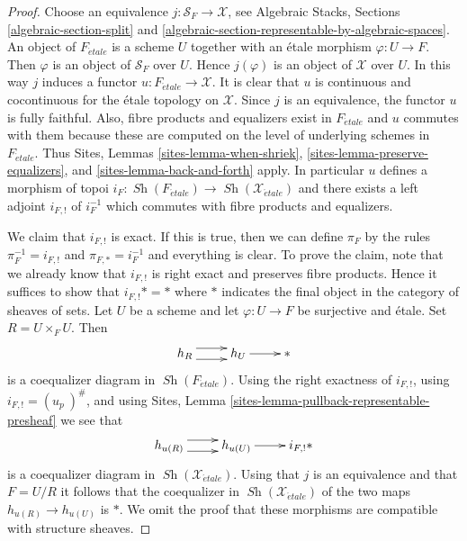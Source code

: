 \documentclass{stacks-project}
\theoremstyle{plain}
\theoremstyle{definition}
\theoremstyle{remark}
\numberwithin{equation}{subsection}
\def\Sh{\mathop{\mathit{Sh}}\nolimits}
\def\etale{{\acute{e}tale}}
\begin{document}
\begin{proof}
Choose an equivalence $j : \mathcal{S}_F \to \mathcal{X}$, see
Algebraic Stacks, Sections \ref{algebraic-section-split} and
\ref{algebraic-section-representable-by-algebraic-spaces}.
An object of $F_\etale$ is a scheme $U$ together with an
\'etale morphism $\varphi : U \to F$. Then $\varphi$ is an object
of $\mathcal{S}_F$ over $U$. Hence $j(\varphi)$ is an object of
$\mathcal{X}$ over $U$. In this way $j$ induces a functor
$u : F_\etale \to \mathcal{X}$. It is clear that
$u$ is continuous and cocontinuous for the \'etale topology on
$\mathcal{X}$. Since $j$ is an equivalence, the functor $u$ is fully
faithful. Also, fibre products and equalizers exist in $F_\etale$
and $u$ commutes with them because these are computed on the level
of underlying schemes in $F_\etale$. Thus
Sites, Lemmas \ref{sites-lemma-when-shriek},
\ref{sites-lemma-preserve-equalizers}, and
\ref{sites-lemma-back-and-forth}
apply. In particular $u$ defines a morphism of topoi
$i_F : \Sh(F_\etale) \to \Sh(\mathcal{X}_\etale)$
and there exists a left adjoint $i_{F, !}$ of $i_F^{-1}$ which commutes
with fibre products and equalizers.

\medskip\noindent
We claim that $i_{F, !}$ is exact. If this is true, then we can define
$\pi_F$ by the rules $\pi_F^{-1} = i_{F, !}$ and $\pi_{F, *} = i_F^{-1}$
and everything is clear. To prove the claim, note that we already know
that $i_{F, !}$
is right exact and preserves fibre products. Hence it suffices to show
that $i_{F, !}* = *$ where $*$ indicates the final object in the category
of sheaves of sets. Let $U$ be a scheme and let
$\varphi : U \to F$ be surjective and \'etale. Set $R = U \times_F U$.
Then
$$
\xymatrix{
h_R \ar@<1ex>[r] \ar@<-1ex>[r] & h_U \ar[r] & {*}
}
$$
is a coequalizer diagram in $\Sh(F_\etale)$. Using the
right exactness of $i_{F, !}$, using $i_{F, !} = (u_p\ )^\#$, and using
Sites, Lemma \ref{sites-lemma-pullback-representable-presheaf}
we see that
$$
\xymatrix{
h_{u(R)} \ar@<1ex>[r] \ar@<-1ex>[r] & h_{u(U)} \ar[r] & i_{F, !}{*}
}
$$
is a coequalizer diagram in $\Sh(\mathcal{X}_\etale)$. Using that
$j$ is an equivalence and that $F = U/R$ it follows that
the coequalizer in $\Sh(\mathcal{X}_\etale)$ of the
two maps $h_{u(R)} \to h_{u(U)}$ is $*$. We omit the proof that
these morphisms are compatible with structure sheaves.
\end{proof}
\end{document}
